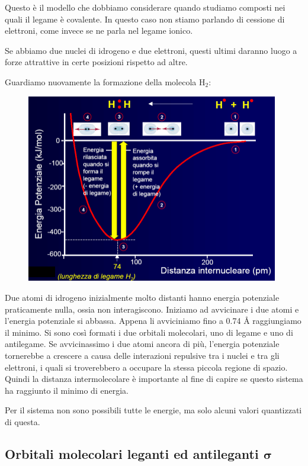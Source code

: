 Questo è il modello che dobbiamo considerare quando studiamo composti nei quali il legame è covalente. In questo caso non stiamo parlando di cessione di elettroni, come invece se ne parla nel legame ionico.

Se abbiamo due nuclei di idrogeno e due elettroni, questi ultimi daranno luogo a forze attrattive in certe posizioni rispetto ad altre.

\vspace{0.2cm}Guardiamo nuovamente la formazione della molecola H$_2$:

\begin{figure}[H]
    \centering
    \includegraphics[width=11cm]{immagini/legame_covalente_H_2.png}
\end{figure}

Due atomi di idrogeno inizialmente molto distanti hanno energia potenziale praticamente nulla, ossia non interagiscono. Iniziamo ad avvicinare i due atomi e l'energia potenziale si abbassa. Appena li avviciniamo fino a 0.74 Å raggiungiamo il minimo. Si sono così formati i due orbitali molecolari, uno di legame e uno di antilegame. Se avvicinassimo i due atomi ancora di più, l'energia potenziale tornerebbe a crescere a causa delle interazioni repulsive tra i nuclei e tra gli elettroni, i quali si troverebbero a occupare la stessa piccola regione di spazio. Quindi la distanza intermolecolare è importante al fine di capire se questo sistema ha raggiunto il minimo di energia.

Per il sistema non sono possibili tutte le energie, ma solo alcuni valori quantizzati di questa.
\subsection{Orbitali molecolari leganti ed antileganti $\boldsymbol{\sigma}$}

